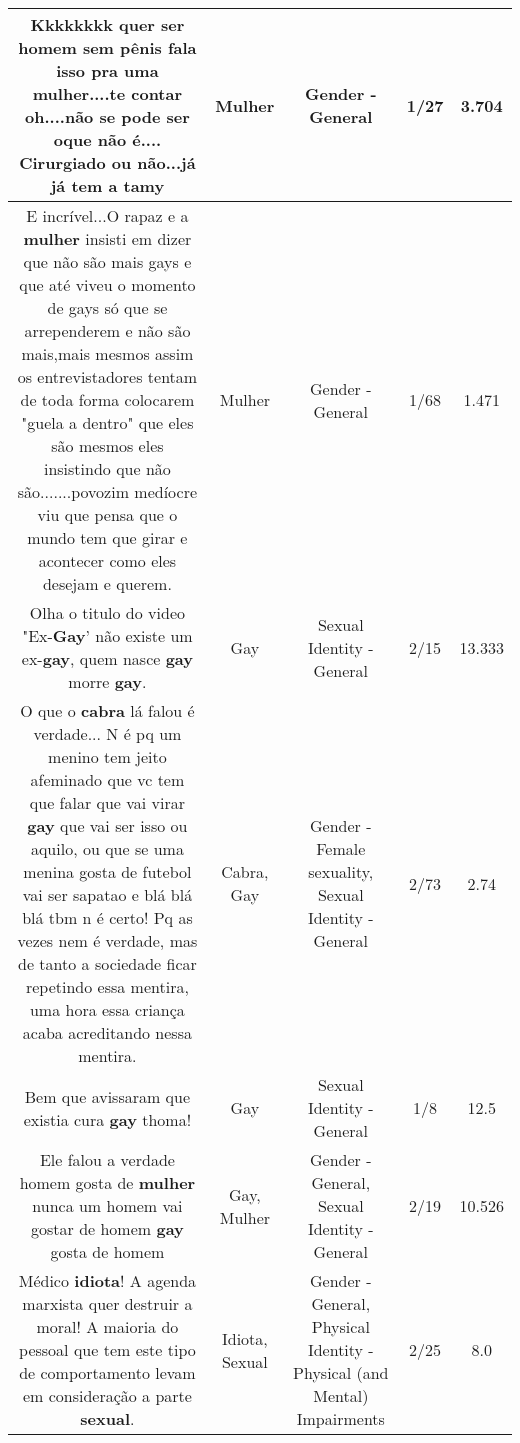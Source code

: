 \documentclass[11pt]{article}
\newlength\mylength
\begin{document}
\begin{center}
\begin{longtable}{|C{.65\mylength}|C{.30\mylength}|C{.12\mylength}|C{.12\mylength}|C{.12\mylength}|}
  \small Kkkkkkkk quer ser homem sem pênis fala isso pra uma \textbf{mulher}....te contar oh....não se pode ser oque não é.... Cirurgiado ou não...já já tem a tamy\normalsize   & Mulher & Gender - General & 1/27 & 3.704 \\  \hline
  \small E incrível...O rapaz e a \textbf{mulher} insisti em dizer que não são mais gays e que até viveu o momento de gays só que se arrependerem e não são mais,mais mesmos assim os entrevistadores tentam de toda forma colocarem "guela a dentro" que eles são mesmos eles insistindo que não são.......povozim medíocre viu que pensa que o mundo tem que girar e acontecer como eles desejam e querem.\normalsize   & Mulher & Gender - General & 1/68 & 1.471 \\  \hline
  \small Olha o titulo do video "Ex-\textbf{Gay}' não existe um ex-\textbf{gay}, quem nasce \textbf{gay} morre \textbf{gay}.\normalsize   & Gay & Sexual Identity - General & 2/15 & 13.333 \\  \hline
  \small O que o \textbf{cabra} lá falou é verdade... N é pq um menino tem jeito afeminado que vc tem que falar que vai virar \textbf{gay} que vai ser isso ou aquilo, ou que se uma menina gosta de futebol vai ser sapatao e blá blá blá tbm n é certo! Pq as vezes nem é verdade, mas de tanto a sociedade ficar repetindo essa mentira, uma hora essa criança acaba acreditando nessa mentira.\normalsize   & Cabra, Gay & Gender - Female sexuality, Sexual Identity - General & 2/73 & 2.74 \\  \hline
  \small Bem que avissaram que existia cura \textbf{gay} thoma!\normalsize   & Gay & Sexual Identity - General & 1/8 & 12.5 \\  \hline
  \small Ele falou a verdade homem gosta de \textbf{mulher} nunca um homem vai gostar de homem \textbf{gay} gosta de homem\normalsize   & Gay, Mulher & Gender - General, Sexual Identity - General & 2/19 & 10.526 \\  \hline
  \small Médico \textbf{idiota}! A agenda marxista quer destruir a moral! A maioria do pessoal que tem este tipo de comportamento levam em consideração a parte \textbf{sexual}.\normalsize   & Idiota, Sexual & Gender - General, Physical Identity - Physical (and Mental) Impairments & 2/25 & 8.0 \\  \hline

\end{longtable}
\end{center}
\end{document}
